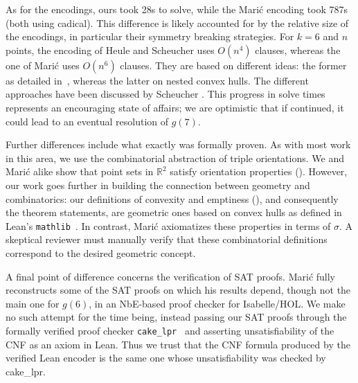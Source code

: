 As for the encodings,
ours took 28s to solve,
while the Marić encoding took 787s (both using \textsf{cadical}).
This difference is likely accounted for by the relative size of the encodings,
in particular their symmetry breaking strategies.
For $k=6$ and $n$ points,
the encoding of Heule and Scheucher uses $O(n^4)$ clauses,
whereas the one of Marić uses $O(n^6)$ clauses.
They are based on different ideas:
the former as detailed in~,
whereas the latter on nested convex hulls.
The different approaches have been discussed by Scheucher \cite{scheucherTwoDisjoint5holes2020}.
This progress in solve times
represents an encouraging state of affairs;
we are optimistic that if continued,
it could lead to an eventual resolution of $g(7)$.

Further differences include what exactly was formally proven.
As with most work in this area,
we use the combinatorial abstraction of triple orientations.
We and Marić alike show that point sets in $\mathbb R^2$
satisfy orientation properties ().
However, our work goes further in building the connection
between geometry and combinatorics:
our definitions of convexity and emptiness (),
and consequently the theorem statements,
are geometric ones based on convex hulls
as defined in Lean's \texttt{mathlib}~\cite{The_mathlib_Community_2020}.
In contrast, Marić axiomatizes these properties in terms of $\sigma$.
A skeptical reviewer must manually verify that these combinatorial definitions
correspond to the desired geometric concept.

A final point of difference concerns the verification of SAT proofs.
Marić fully reconstructs some of the SAT proofs on which his results depend,
though not the main one for $g(6)$,
in an NbE-based proof checker for Isabelle/HOL.
We make no such attempt for the time being,
instead passing our SAT proofs through the
formally verified proof checker \texttt{cake\_lpr}~\cite{tanVerifiedPropagationRedundancy2023}
and asserting unsatisfiability of the CNF as an axiom in Lean.
Thus we trust that the CNF formula produced by the verified Lean encoder
is the same one whose unsatisfiability was checked by \textsf{cake\_lpr}.
